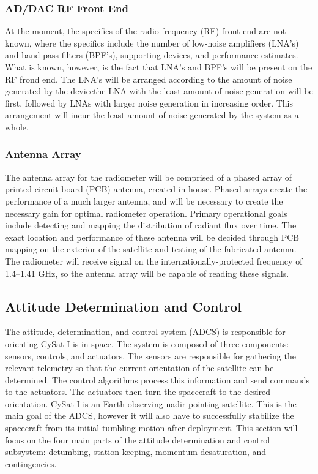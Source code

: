 \documentclass[12pt]{article}
\begin{document}
\subsubsection{AD/DAC RF Front End}

At the moment, the specifics of the radio frequency (RF) front end are not known, where the specifics include the number of low-noise amplifiers (LNA's) and band pass filters (BPF's), supporting devices, and performance estimates. What is known, however, is the fact that LNA's and BPF's will be present on the RF frond end. The LNA's will be arranged according to the amount of noise generated by the device\textemdash{}the LNA with the least amount of noise generation will be first, followed by LNAs with larger noise generation in increasing order. This arrangement will incur the least amount of noise generated by the system as a whole.

\subsubsection{Antenna Array}

The antenna array for the radiometer will be comprised of a phased array of printed circuit board (PCB) antenna, created in-house. Phased arrays create the performance of a much larger antenna, and will be necessary to create the necessary gain for optimal radiometer operation. Primary operational goals include detecting and mapping the distribution of radiant flux over time. The exact location and performance of these antenna will be decided through PCB mapping on the exterior of the satellite and testing of the fabricated antenna. The radiometer will receive signal on the internationally-protected frequency of \numrange{1.4}{1.41} \si{\giga\hertz}, so the antenna array will be capable of reading these signals.

\subsection{Attitude Determination and Control}

The attitude, determination, and control system (ADCS) is responsible for orienting CySat-I is in space. The system is composed of three components: sensors, controls, and actuators. The sensors are responsible for gathering the relevant telemetry so that the current orientation of the satellite can be determined. The control algorithms process this information and send commands to the actuators. The actuators then turn the spacecraft to the desired orientation. CySat-I is an Earth-observing nadir-pointing satellite. This is the main goal of the ADCS, however it will also have to successfully stabilize the spacecraft from its initial tumbling motion after deployment. This section will focus on the four main parts of the attitude determination and control subsystem: detumbing, station keeping, momentum desaturation, and contingencies.
\end{document}
